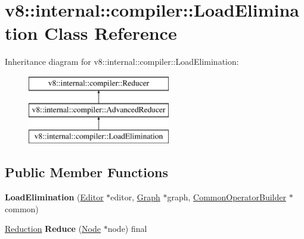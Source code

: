 \hypertarget{classv8_1_1internal_1_1compiler_1_1_load_elimination}{}\section{v8\+:\+:internal\+:\+:compiler\+:\+:Load\+Elimination Class Reference}
\label{classv8_1_1internal_1_1compiler_1_1_load_elimination}
Inheritance diagram for v8\+:\+:internal\+:\+:compiler\+:\+:Load\+Elimination\+:\begin{figure}[H]
\begin{center}
\leavevmode
\includegraphics[height=3.000000cm]{classv8_1_1internal_1_1compiler_1_1_load_elimination}
\end{center}
\end{figure}
\subsection*{Public Member Functions}
\begin{DoxyCompactItemize}
\item 
{\bfseries Load\+Elimination} (\hyperlink{classv8_1_1internal_1_1compiler_1_1_advanced_reducer_1_1_editor}{Editor} $\ast$editor, \hyperlink{classv8_1_1internal_1_1compiler_1_1_graph}{Graph} $\ast$graph, \hyperlink{classv8_1_1internal_1_1compiler_1_1_common_operator_builder}{Common\+Operator\+Builder} $\ast$common)\hypertarget{classv8_1_1internal_1_1compiler_1_1_load_elimination_a22ed3c23476d8b3b917a0eef0c1ef3af}{}\label{classv8_1_1internal_1_1compiler_1_1_load_elimination_a22ed3c23476d8b3b917a0eef0c1ef3af}

\item 
\hyperlink{classv8_1_1internal_1_1compiler_1_1_reduction}{Reduction} {\bfseries Reduce} (\hyperlink{classv8_1_1internal_1_1compiler_1_1_node}{Node} $\ast$node) final\hypertarget{classv8_1_1internal_1_1compiler_1_1_load_elimination_ae7f1b6c79aa0c43f7b4c393465596537}{}\label{classv8_1_1internal_1_1compiler_1_1_load_elimination_ae7f1b6c79aa0c43f7b4c393465596537}

\end{DoxyCompactItemize}
